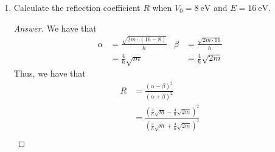 \documentclass[../psets.tex]{subfiles}
\begin{document}
\begin{enumerate}
\begin{enumerate}
\begin{proof}[Answer]
\begin{equation*}
                = C\e[i\alpha(0)]
                = C
            \end{equation*}
            Similarly, it follows from the continuity of the \emph{derivative} of the wave function at $x=0$ that
            \begin{equation*}
                i\alpha A-i\alpha B = \dv{x}(A\e[i\alpha x]+B\e[-i\alpha x])_{x=0}
                = \left( \dv{\psi_\text{I}}{x} \right)_{x=0}
                = \left( \dv{\psi_\text{II}}{x} \right)_{x=0}
                = \dv{x}(C\e[i\beta x])_{x=0}
                = i\beta C
            \end{equation*}
            Thus, we have that
            \begin{align*}
                A &= \frac{C(\alpha+\beta)}{2\alpha}&
                B &= \frac{C(\alpha-\beta)}{2\alpha}
            \end{align*}
            We know that the probability of the particle going left to right in region I is $|A|^2$ and that the probability of the particle going from right to left in region I is $|B|^2$. Thus, since the incident/reflected flux factors in the speed $c$ of the particle in either direction, the respective fluxes are $c|A|^2$ and $c|B|^2$. But this implies that
            \begin{align*}
                R &= \frac{c|B|^2}{c|A|^2}\\
                &= \frac{|B|^2}{|A|^2}\\
                \Aboxed{R &= \frac{(\alpha-\beta)^2}{(\alpha+\beta)^2}}
            \end{align*}
        \end{proof}
        \item Calculate the reflection coefficient $R$ when $V_0=\SI{8}{\electronvolt}$ and $E=\SI{16}{\electronvolt}$.
        \begin{proof}[Answer]
            We have that
            \begin{align*}
                \alpha &= \frac{\sqrt{2m\cdot(16-8)}}{\hbar}&
                    \beta &= \frac{\sqrt{2m\cdot 16}}{\hbar}\\
                &= \frac{4}{\hbar}\sqrt{m}&
                    &= \frac{4}{\hbar}\sqrt{2m}
            \end{align*}
            Thus, we have that
            \begin{align*}
                R &= \frac{(\alpha-\beta)^2}{(\alpha+\beta)^2}\\
                &= \frac{(\frac{4}{\hbar}\sqrt{m}-\frac{4}{\hbar}\sqrt{2m})^2}{(\frac{4}{\hbar}\sqrt{m}+\frac{4}{\hbar}\sqrt{2m})^2}\\

\end{align*}
\end{proof}
\end{enumerate}
\end{enumerate}
\end{document}
